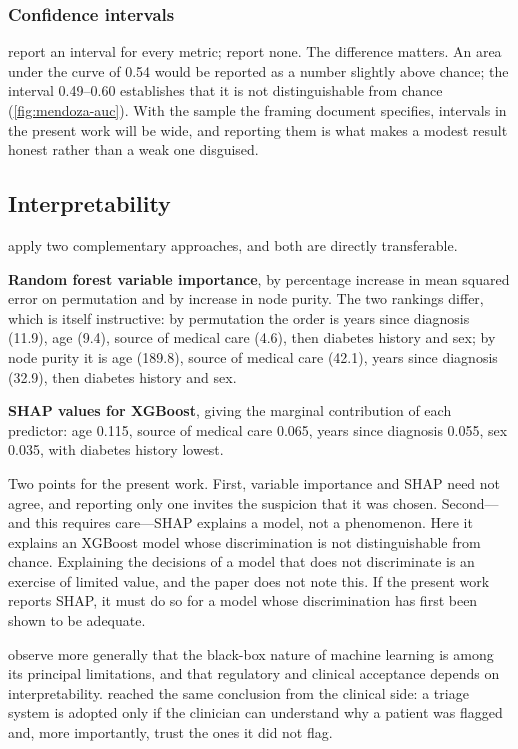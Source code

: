 \documentclass[12pt,a4paper,oneside]{report}
\begin{document}
\subsubsection{Confidence intervals}

\Textcite{mendoza2025} report an interval for every metric; \textcite{efendi2025} report none. The difference matters. An area under the curve of 0.54 would be reported as a number slightly above chance; the interval 0.49--0.60 establishes that it is not distinguishable from chance (\cref{fig:mendoza-auc}). With the sample the framing document specifies, intervals in the present work will be wide, and reporting them is what makes a modest result honest rather than a weak one disguised.

\subsection{Interpretability}\label{sec:interpretability}

\Textcite{mendoza2025} apply two complementary approaches, and both are directly transferable.

\textbf{Random forest variable importance}, by percentage increase in mean squared error on permutation and by increase in node purity. The two rankings differ, which is itself instructive: by permutation the order is years since diagnosis (11.9), age (9.4), source of medical care (4.6), then diabetes history and sex; by node purity it is age (189.8), source of medical care (42.1), years since diagnosis (32.9), then diabetes history and sex.

\textbf{SHAP values for XGBoost}, giving the marginal contribution of each predictor: age 0.115, source of medical care 0.065, years since diagnosis 0.055, sex 0.035, with diabetes history lowest.

Two points for the present work. First, variable importance and SHAP need not agree, and reporting only one invites the suspicion that it was chosen. Second---and this requires care---SHAP explains a model, not a phenomenon. Here it explains an XGBoost model whose discrimination is not distinguishable from chance. Explaining the decisions of a model that does not discriminate is an exercise of limited value, and the paper does not note this. If the present work reports SHAP, it must do so for a model whose discrimination has first been shown to be adequate.

\Textcite{liu2025review} observe more generally that the black-box nature of machine learning is among its principal limitations, and that regulatory and clinical acceptance depends on interpretability.  reached the same conclusion from the clinical side: a triage system is adopted only if the clinician can understand why a patient was flagged and, more importantly, trust the ones it did not flag.
\end{document}
